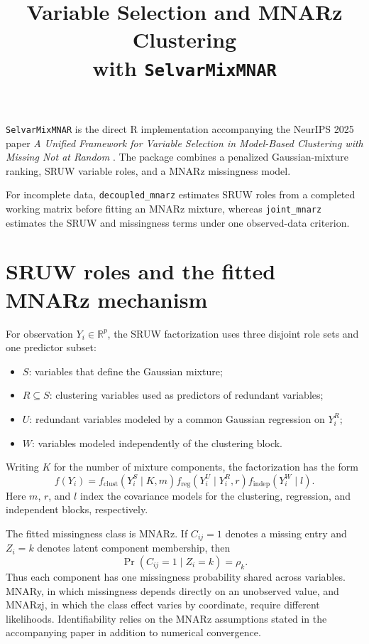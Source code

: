 \documentclass[10pt]{article}\usepackage[]{graphicx}\usepackage[]{xcolor}
\title{Variable Selection and MNARz Clustering\\
with \texttt{SelvarMixMNAR}}
\author{}
\date{}
\begin{document}
\maketitle



\texttt{SelvarMixMNAR} is the direct R implementation accompanying the
NeurIPS 2025 paper \emph{A Unified Framework for Variable Selection in
Model-Based Clustering with Missing Not at Random}
\cite{ho2025unifiedmbcmnar}. The package combines a penalized Gaussian-mixture
ranking, SRUW variable roles, and a MNARz missingness model.

For incomplete data, \texttt{decoupled\_mnarz} estimates SRUW roles from a
completed working matrix before fitting an MNARz mixture, whereas
\texttt{joint\_mnarz} estimates the SRUW and missingness terms under one
observed-data criterion.

\section{SRUW roles and the fitted MNARz mechanism}

For observation $Y_i \in \mathbb{R}^p$, the SRUW factorization uses three
disjoint role sets and one predictor subset:

\begin{itemize}
\item $S$: variables that define the Gaussian mixture;
\item $R \subseteq S$: clustering variables used as predictors of redundant
 variables;
\item $U$: redundant variables modeled by a common Gaussian regression on
 $Y_i^R$;
\item $W$: variables modeled independently of the clustering block.
\end{itemize}

Writing $K$ for the number of mixture components, the factorization has the
form
\[
f(Y_i)
= f_{\mathrm{clust}}(Y_i^S \mid K,m)
 f_{\mathrm{reg}}(Y_i^U \mid Y_i^R,r)
 f_{\mathrm{indep}}(Y_i^W \mid l).
\]
Here $m$, $r$, and $l$ index the covariance models for the clustering,
regression, and independent blocks, respectively.

The fitted missingness class is MNARz. If $C_{ij}=1$ denotes a missing entry
and $Z_i=k$ denotes latent component membership, then
\[
\Pr(C_{ij}=1 \mid Z_i=k)=\rho_k.
\]
Thus each component has one missingness probability shared across variables.
MNARy, in which missingness depends directly on an unobserved value, and
MNARzj, in which the class effect varies by coordinate, require different
likelihoods. Identifiability relies on the MNARz assumptions stated in the
accompanying paper in addition to numerical convergence.
\end{document}
